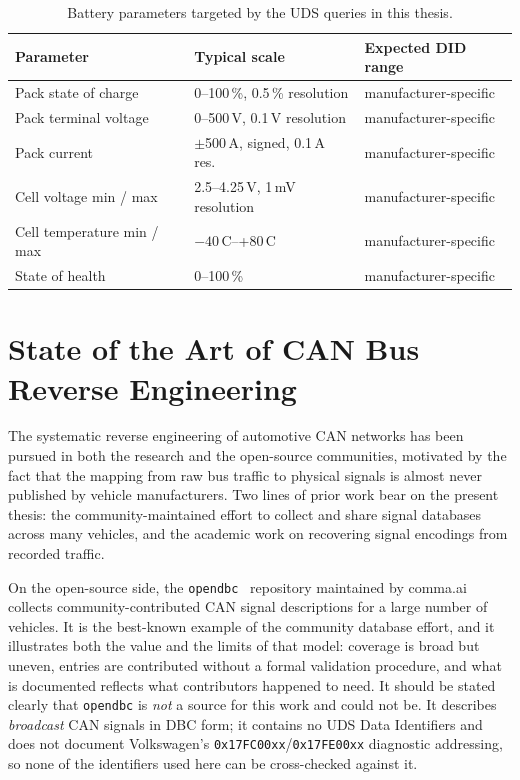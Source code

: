 \documentclass[11pt,a4paper,oneside,parskip=half]{scrreprt}
\providecommand{\hex}{}\renewcommand{\hex}[1]{\texttt{0x#1}}
\begin{document}
\begin{table}[H]
\caption{Battery parameters targeted by the UDS queries in this thesis.}
\label{tab:battery_signals}
\centering
\begin{tabular}{lp{4cm}l}
\toprule
\textbf{Parameter}           & \textbf{Typical scale}             & \textbf{Expected DID range} \\
\midrule
Pack state of charge         & 0--100\,\%, 0.5\,\% resolution     & manufacturer-specific \\
Pack terminal voltage        & 0--500\,V, 0.1\,V resolution       & manufacturer-specific \\
Pack current                 & $\pm$500\,A, signed, 0.1\,A res.   & manufacturer-specific \\
Cell voltage min / max       & 2.5--4.25\,V, 1\,mV resolution     & manufacturer-specific \\
Cell temperature min / max   & $-40$\,\textdegree{}C--+80\,\textdegree{}C & manufacturer-specific \\
State of health              & 0--100\,\%                         & manufacturer-specific \\
\bottomrule
\end{tabular}
\end{table}

\section{State of the Art of CAN Bus Reverse Engineering}
\label{sec:sota}
The systematic reverse engineering of automotive CAN networks has been pursued in both the research and the open-source communities, motivated by the fact that the mapping from raw bus traffic to physical signals is almost never published by vehicle manufacturers. Two lines of prior work bear on the present thesis: the community-maintained effort to collect and share signal databases across many vehicles, and the academic work on recovering signal encodings from recorded traffic.

On the open-source side, the \texttt{opendbc}~\cite{opendbc} repository maintained by comma.ai collects community-contributed CAN signal descriptions for a large number of vehicles. It is the best-known example of the community database effort, and it illustrates both the value and the limits of that model: coverage is broad but uneven, entries are contributed without a formal validation procedure, and what is documented reflects what contributors happened to need. It should be stated clearly that \texttt{opendbc} is \emph{not} a source for this work and could not be. It describes \emph{broadcast} CAN signals in DBC form; it contains no UDS Data Identifiers and does not document Volkswagen's \hex{17FC00xx}/\hex{17FE00xx} diagnostic addressing, so none of the identifiers used here can be cross-checked against it.
\end{document}
